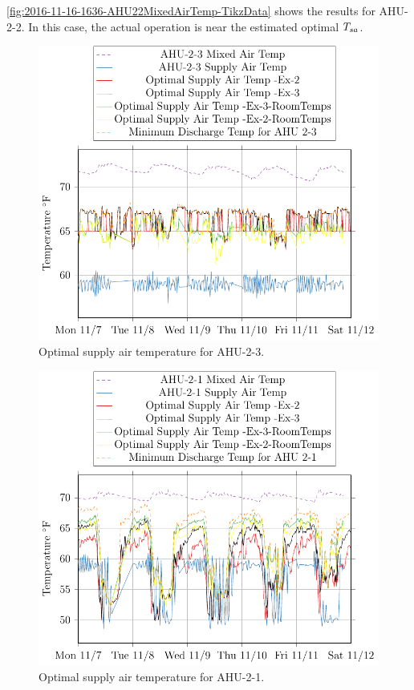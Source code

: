 \figref{} \ref{fig:2016-11-16-1636-AHU22MixedAirTemp-TikzData} shows the
results for AHU-2-2.  In this case, the actual operation is near the
estimated optimal \(T_{sa}\).

\begin{figure}
\centering
\includegraphics[]{Plots/2016-11-30-1004-AHU23MixedAirTemp-TikzData.pdf}
\caption{Optimal supply air temperature for AHU-2-3.}
\label{fig:2016-11-30-1004-AHU23MixedAirTemp-TikzData}
\end{figure}

\begin{figure}
\centering
\includegraphics[]{Plots/2016-11-30-0943-AHU21MixedAirTemp-TikzData.pdf}
\caption{Optimal supply air temperature for AHU-2-1.}
\label{fig:2016-11-30-0943-AHU21MixedAirTemp-TikzData}
\end{figure}

